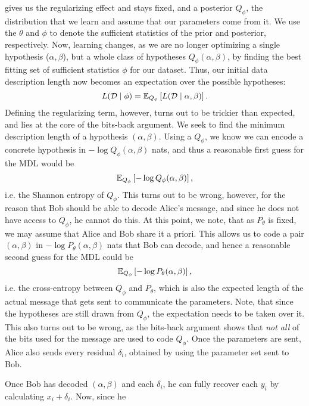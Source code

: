 gives us the regularizing effect and stays fixed, and a posterior $Q_\phi$, the
distribution that we learn and assume that our parameters come
from it. We use the $\theta$ and $\phi$ to denote the sufficient
statistics of the prior and posterior, respectively. Now, learning changes, as
we are no longer optimizing a single hypothesis ($\alpha, \beta$), but a whole
class of hypotheses $Q_\phi(\alpha, \beta)$, by finding the best fitting set
of sufficient statistics $\phi$ for our dataset. Thus, our initial data
description length now becomes an expectation over the possible hypotheses:
\[
  L(\Data \mid \phi) = \Exp{L(\Data \mid \alpha, \beta)}{Q_\phi}.
\]
Defining the regularizing term, however, turns out to be trickier than expected,
and lies at the core of the bits-back argument. We seek to find the minimum
description length of a hypothesis $(\alpha, \beta)$. Using a $Q_\phi$, we know
we can encode a concrete hypothesis in $-\log Q_\phi (\alpha, \beta)$ nats, and thus a
reasonable first guess for the MDL would be
\begin{equation}
\label{eq:hypothesis_entropy}
  \Exp{-\log Q_\phi(\alpha, \beta)}{Q_\phi},
\end{equation}
i.e. the Shannon entropy of $Q_\phi$.
This turns out to be wrong, however, for the reason that Bob should be able to
decode Alice's message, and since he does not have access to $Q_\phi$, he cannot
do this. 
At this point, we note, that as $P_\theta$ is fixed, we may assume that Alice
and Bob share it a priori. This allows us to code a pair $(\alpha, \beta)$ in
$-\log P_\theta(\alpha, \beta)$ nats that Bob can decode, and hence a
reasonable second guess for the MDL could be
\begin{equation}
\label{eq:hypothesis_cross_entropy}
\Exp{-\log P_\theta(\alpha, \beta)}{Q_\phi},
\end{equation}
i.e. the cross-entropy between $Q_\phi$ and $P_\theta$, which is also the
expected length of the actual message that gets sent to communicate the
parameters. Note, that since the hypotheses are still drawn from $Q_\phi$,
the expectation needs to be taken over it. This also turns out to be wrong,
as the bits-back argument shows that \textit{not all} of the bits used for
the message are used to code $Q_\phi$. Once the parameters are sent, Alice also
sends every residual $\delta_i$, obtained by using the parameter set sent to Bob.
\par
Once Bob has decoded $(\alpha, \beta)$ and each $\delta_i$,
he can fully recover each $y_i$ by calculating $x_i + \delta_i$. Now, since he
